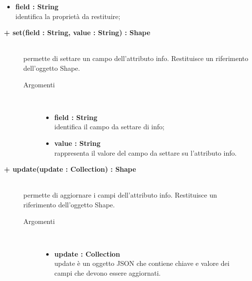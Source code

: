 \begin{description}
\begin{description}
\begin{description}
\begin{itemize}
					\item \textbf{field : String			} \hfill \\
					identifica la proprietà da restituire;
				\end{itemize}
		\end{description}

\end{description}


		\begin{description}
		\item[\textbf{\color{blue}+ set(field : String, value : String) : Shape			}] \hfill \\
			permette di settare un campo dell'attributo info. Restituisce un riferimento dell'oggetto Shape.
			
		\begin{description}
			\item[Argomenti] \hfill \\
				\begin{itemize}
				
					\item \textbf{field : String			} \hfill \\
					identifica il campo da settare di info;
					\item \textbf{value : String			} \hfill \\
					rappresenta il valore del campo da settare su l'attributo info.
				\end{itemize}
		\end{description}

\end{description}

\begin{description}
		\item[\textbf{\color{blue}+ update(update : Collection) : Shape			}] \hfill \\
			permette di aggiornare i campi dell'attributo info. Restituisce un riferimento dell'oggetto Shape.
			
		\begin{description}
			\item[Argomenti] \hfill \\
				\begin{itemize}
				
					\item \textbf{update : Collection			} \hfill \\
					update è un oggetto JSON che contiene chiave e valore dei campi che devono essere aggiornati. 
				\end{itemize}
		\end{description}


\end{description}
\end{description}
